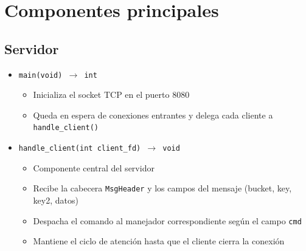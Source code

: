 \documentclass[12pt, letterpaper]{article}
\begin{document}
\section{Componentes principales}

\subsection*{Servidor}
\begin{itemize}
    \item \texttt{main(void) $\to$ int}
        \begin{itemize}
            \item Inicializa el socket TCP en el puerto 8080
            \item Queda en espera de conexiones entrantes y delega cada 
                  cliente a \texttt{handle\_client()}
        \end{itemize}
    \item \texttt{handle\_client(int client\_fd) $\to$ void}
        \begin{itemize}
            \item Componente central del servidor
            \item Recibe la cabecera \texttt{MsgHeader} y los campos del 
                  mensaje (bucket, key, key2, datos)
            \item Despacha el comando al manejador correspondiente según 
                  el campo \texttt{cmd}
            \item Mantiene el ciclo de atención hasta que el cliente 
                  cierra la conexión
        \end{itemize}


\end{itemize}
\end{document}
